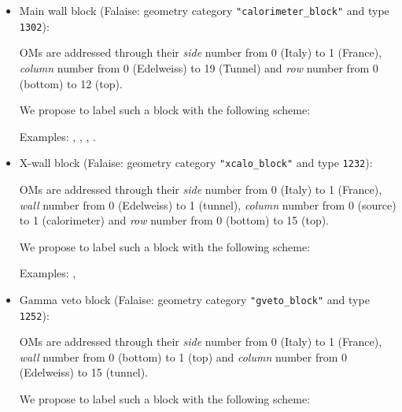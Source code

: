 \documentclass[12pt,a4paper]{article}
\begin{document}
\begin{itemize}
  
\item Main wall block (Falaise: geometry category \texttt{"calorimeter\_block"}
  and  type  \texttt{1302}):

  \par  OMs are  addressed  through  their
  \emph{side}   number from 0 (Italy)     to  1 (France),
  \emph{column} number from 0 (Edelweiss) to 19 (Tunnel) and
  \emph{row}    number from 0 (bottom)    to 12 (top).

  \par We  propose to label such a block with the following scheme:
  \begin{center}
  \end{center}
  \vskip 10pt
  \par\noindent Examples: , 
  , , .
  
\item X-wall block (Falaise: geometry category \texttt{"xcalo\_block"} and type
  \texttt{1232}):
  
  \par OMs  are addressed  through their
  \emph{side}   number from 0 (Italy)     to  1 (France),
  \emph{wall}   number from 0 (Edelweiss) to  1 (tunnel),
  \emph{column} number from 0 (source)    to  1 (calorimeter) and
  \emph{row}    number from 0 (bottom)    to 15 (top).
  
  \par  We propose  to
  label such a block with the following scheme:
  \begin{center}
  \end{center}
  \vskip 10pt
  \par\noindent Examples: , 
  
\item Gamma veto block  (Falaise: geometry category \texttt{"gveto\_block"} and
  type   \texttt{1252}):
  
  \par   OMs  are   addressed  through   their
  \emph{side}   number from 0 (Italy)     to  1 (France),
  \emph{wall}   number from 0 (bottom)    to  1 (top)  and
  \emph{column} number from 0 (Edelweiss) to 15 (tunnel).
  
  \par We propose to label  such a block
  with the following scheme:
  \begin{center}
  \end{center}
  \vskip 10pt
  

\end{itemize}
\end{document}
